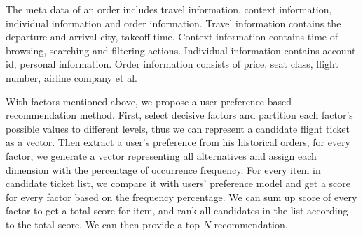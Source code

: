 \documentclass{llncs}
\begin{document}
The meta data of an order includes travel information, context information, individual information and order information. Travel information contains the departure and arrival city, takeoff time. Context information contains time of browsing, searching and filtering actions. Individual information contains account id, personal information. Order information consists of price, seat class, flight number, airline company  et al.\par

With factors mentioned above, we propose a user preference based recommendation method. First, select decisive factors and partition each factor's possible values to different levels, thus we can represent a candidate flight ticket as a vector. Then extract a user's preference from his historical orders, for every factor, we generate a vector representing all alternatives and assign each dimension with the percentage of occurrence frequency. For every item in candidate ticket list, we compare it with users' preference model and get a score for every factor based on the frequency percentage. We can sum up score of every factor to get a total score for item, and rank all candidates in the list according to the total score. We can then provide a top-$N$ recommendation.\par
\end{document}

